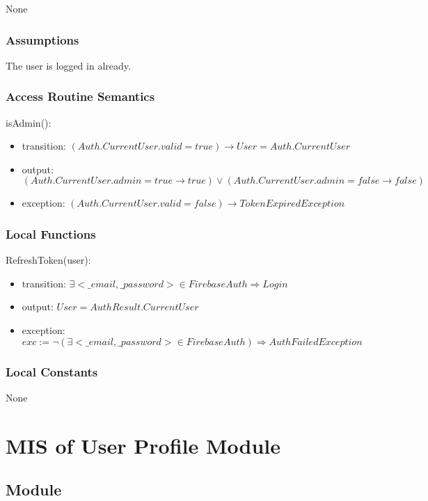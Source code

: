 \documentclass[12pt, titlepage]{article}
\begin{document}
None

\subsubsection{Assumptions}

The user is logged in already.

\subsubsection{Access Routine Semantics}

\noindent isAdmin():
\begin{itemize}
\item transition: $(Auth.CurrentUser.valid = true) \rightarrow User = Auth.CurrentUser$ 
\item output: $(Auth.CurrentUser.admin = true \rightarrow true) \lor (Auth.CurrentUser.admin = false \rightarrow false)$
\item exception: $(Auth.CurrentUser.valid = false) \rightarrow TokenExpiredException$
\end{itemize}

\subsubsection{Local Functions}

\noindent RefreshToken(user):
\begin{itemize}
\item transition: $\exists <\_email, \_password> \in FirebaseAuth \Rightarrow Login$
\item output: $User = AuthResult.CurrentUser$
\item exception: $exc:= \lnot(\exists <\_email, \_password> \in FirebaseAuth) \Rightarrow AuthFailedException$
\end{itemize}

\subsubsection{Local Constants}

None

\newpage

\section{MIS of User Profile Module} \label{mUP}

\subsection{Module}
\end{document}
